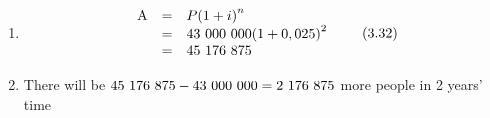 {\begin{mdframed}[linewidth=4, leftmargin=40, rightmargin=40]
\begin{exercise}
\begin{enumerate}[noitemsep, label=\textbf{Step} \textbf{\arabic*}. ]
    \begin{equation}
    A=P{\left(1+i\right)}^{n}\tag{3.31}
      \end{equation}
        \item  
        \label{m39334*id74650}\nopagebreak\noindent{}
          
    \begin{equation}
    \begin{array}{ccc}\hfill \mathrm{A}& =& P{\left(1+i\right)}^{n}\hfill \\ & =& 43\phantom{\rule{3.33333pt}{0ex}}000\phantom{\rule{3.33333pt}{0ex}}000{\left(1+0,025\right)}^{2}\hfill \\ & =& 45\phantom{\rule{3.33333pt}{0ex}}176\phantom{\rule{3.33333pt}{0ex}}875\hfill \end{array}\tag{3.32}
      \end{equation}
        \item  
        \label{m39334*id74768}There will be $45\phantom{\rule{3.33333pt}{0ex}}176\phantom{\rule{3.33333pt}{0ex}}875-43\phantom{\rule{3.33333pt}{0ex}}000\phantom{\rule{3.33333pt}{0ex}}000=2\phantom{\rule{3.33333pt}{0ex}}176\phantom{\rule{3.33333pt}{0ex}}875$ more people in 2 years' time
 \par 
        \end{enumerate}
    \end{exercise}
    \end{mdframed}
    }
    \noindent
\label{m39334*secfhsst!!!underscore!!!id3026}\vspace{.5cm} 
      \noindent
